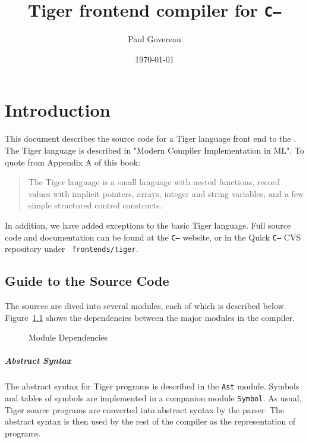 \documentclass[twoside]{report}
\title{Tiger frontend compiler for {\tt C--}}
\author{Paul Govereau}
\date{\today}
\begin{document}
\maketitle
\ifhtml\else\tableofcontents\fi
\clearpage

\chapter{Introduction}
This document describes the source code for a Tiger language front end
to the . The Tiger language is described in "Modern Compiler
Implementation in ML"\cite{appel}. To quote from Appendix A of this
book:
\begin{quote}
The Tiger language is a small language with nested functions, record
values with implicit pointers, arrays, integer and string variables,
and a few simple structured control constructs.
\end{quote}
In addition, we have added exceptions to the basic Tiger language.
Full source code and documentation can be found at the {\tt C--}
website, or in the Quick {\tt C--} CVS repository under {\tt
frontends/tiger}.

\section{Guide to the Source Code}
The sources are dived into several modules, each of which is described
below. Figure~\ref{fig:tiger} shows the dependencies between the major
modules in the compiler.
%
\begin{figure}
\caption{Module Dependencies}
\label{fig:tiger}
\end{figure}

\paragraph{Abstract Syntax}
The abstract syntax for Tiger programs is described in the {\tt Ast}
module. Symbols and tables of symbols are implemented in a companion
module {\tt Symbol}. As usual, Tiger source programs are converted
into abstract syntax by the parser. The abstract syntax is then used
by the rest of the compiler as the representation of programs.
\end{document}
